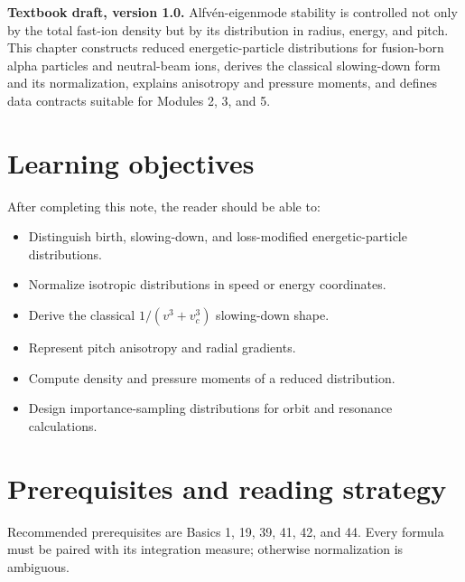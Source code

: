 \documentclass[11pt]{article}
\begin{document}

\begin{overviewbox}
\textbf{Textbook draft, version 1.0.} Alfv\'en-eigenmode stability is controlled not only by the total fast-ion density but by its distribution in radius, energy, and pitch. This chapter constructs reduced energetic-particle distributions for fusion-born alpha particles and neutral-beam ions, derives the classical slowing-down form and its normalization, explains anisotropy and pressure moments, and defines data contracts suitable for Modules 2, 3, and 5.
\end{overviewbox}

\ProjectTOC

\section{Learning objectives}
After completing this note, the reader should be able to:
\begin{itemize}[leftmargin=1.6em]
\item Distinguish birth, slowing-down, and loss-modified energetic-particle distributions.
\item Normalize isotropic distributions in speed or energy coordinates.
\item Derive the classical $1/(v^3+v_c^3)$ slowing-down shape.
\item Represent pitch anisotropy and radial gradients.
\item Compute density and pressure moments of a reduced distribution.
\item Design importance-sampling distributions for orbit and resonance calculations.
\end{itemize}

\section{Prerequisites and reading strategy}
Recommended prerequisites are Basics 1, 19, 39, 41, 42, and 44. Every formula must be paired with its integration measure; otherwise normalization is ambiguous.
\end{document}
